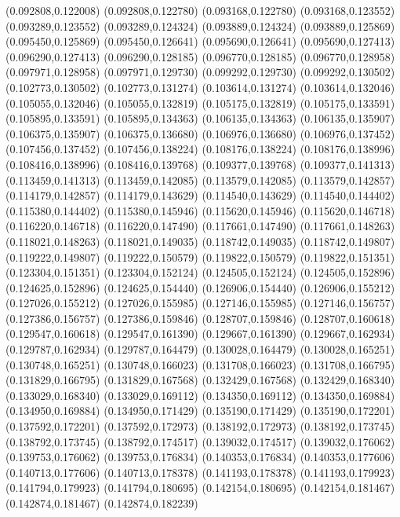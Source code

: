 (0.092808,0.122008)
(0.092808,0.122780)
(0.093168,0.122780)
(0.093168,0.123552)
(0.093289,0.123552)
(0.093289,0.124324)
(0.093889,0.124324)
(0.093889,0.125869)
(0.095450,0.125869)
(0.095450,0.126641)
(0.095690,0.126641)
(0.095690,0.127413)
(0.096290,0.127413)
(0.096290,0.128185)
(0.096770,0.128185)
(0.096770,0.128958)
(0.097971,0.128958)
(0.097971,0.129730)
(0.099292,0.129730)
(0.099292,0.130502)
(0.102773,0.130502)
(0.102773,0.131274)
(0.103614,0.131274)
(0.103614,0.132046)
(0.105055,0.132046)
(0.105055,0.132819)
(0.105175,0.132819)
(0.105175,0.133591)
(0.105895,0.133591)
(0.105895,0.134363)
(0.106135,0.134363)
(0.106135,0.135907)
(0.106375,0.135907)
(0.106375,0.136680)
(0.106976,0.136680)
(0.106976,0.137452)
(0.107456,0.137452)
(0.107456,0.138224)
(0.108176,0.138224)
(0.108176,0.138996)
(0.108416,0.138996)
(0.108416,0.139768)
(0.109377,0.139768)
(0.109377,0.141313)
(0.113459,0.141313)
(0.113459,0.142085)
(0.113579,0.142085)
(0.113579,0.142857)
(0.114179,0.142857)
(0.114179,0.143629)
(0.114540,0.143629)
(0.114540,0.144402)
(0.115380,0.144402)
(0.115380,0.145946)
(0.115620,0.145946)
(0.115620,0.146718)
(0.116220,0.146718)
(0.116220,0.147490)
(0.117661,0.147490)
(0.117661,0.148263)
(0.118021,0.148263)
(0.118021,0.149035)
(0.118742,0.149035)
(0.118742,0.149807)
(0.119222,0.149807)
(0.119222,0.150579)
(0.119822,0.150579)
(0.119822,0.151351)
(0.123304,0.151351)
(0.123304,0.152124)
(0.124505,0.152124)
(0.124505,0.152896)
(0.124625,0.152896)
(0.124625,0.154440)
(0.126906,0.154440)
(0.126906,0.155212)
(0.127026,0.155212)
(0.127026,0.155985)
(0.127146,0.155985)
(0.127146,0.156757)
(0.127386,0.156757)
(0.127386,0.159846)
(0.128707,0.159846)
(0.128707,0.160618)
(0.129547,0.160618)
(0.129547,0.161390)
(0.129667,0.161390)
(0.129667,0.162934)
(0.129787,0.162934)
(0.129787,0.164479)
(0.130028,0.164479)
(0.130028,0.165251)
(0.130748,0.165251)
(0.130748,0.166023)
(0.131708,0.166023)
(0.131708,0.166795)
(0.131829,0.166795)
(0.131829,0.167568)
(0.132429,0.167568)
(0.132429,0.168340)
(0.133029,0.168340)
(0.133029,0.169112)
(0.134350,0.169112)
(0.134350,0.169884)
(0.134950,0.169884)
(0.134950,0.171429)
(0.135190,0.171429)
(0.135190,0.172201)
(0.137592,0.172201)
(0.137592,0.172973)
(0.138192,0.172973)
(0.138192,0.173745)
(0.138792,0.173745)
(0.138792,0.174517)
(0.139032,0.174517)
(0.139032,0.176062)
(0.139753,0.176062)
(0.139753,0.176834)
(0.140353,0.176834)
(0.140353,0.177606)
(0.140713,0.177606)
(0.140713,0.178378)
(0.141193,0.178378)
(0.141193,0.179923)
(0.141794,0.179923)
(0.141794,0.180695)
(0.142154,0.180695)
(0.142154,0.181467)
(0.142874,0.181467)
(0.142874,0.182239)
